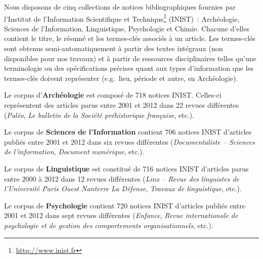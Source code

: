   Nous disposons de cinq collections de notices bibliographiques fournies par
  l'Institut de l’Information Scientifique et
  Technique\footnote{\url{http://www.inist.fr}} (INIST)~: Archéologie, Sciences
  de l'Information, Linguistique, Psychologie et Chimie. Chacune d'elles
  contient le titre, le résumé et les termes-clés associés à un article. Les
  termes-clés sont obtenus semi-automatiquement %
  à partir des textes intégraux (non disponibles pour nos travaux) et à partir
  de ressources disciplinaires telles qu'une terminologie ou des spécifications
  précises quant aux types d'information que les termes-clés doivent représenter
  (e.g.~lieu, période et autre, en Archéologie).

  Le corpus d'\textbf{Archéologie} est composé de 718 notices INIST. Celles-ci
  représentent des articles parus entre 2001 et 2012 dans 22 revues différentes
  (\textit{Paléo}, \textit{Le bulletin de la Société préhistorique française},
  etc.).

  Le corpus de \textbf{Sciences de l'Information} contient 706 notices INIST
  d'articles publiés entre 2001 et 2012 dans six revues différentes
  (\textit{Documentaliste -- Sciences de l'information}, \textit{Document
  numérique}, etc.).

  Le corpus de \textbf{Linguistique} est constitué de 716 notices INIST
  d'articles parus entre 2000 à 2012 dans 12 revues différentes
  (\textit{Linx -- Revue des linguistes de l'Université Paris Ouest Nanterre La
  Défense}, \textit{Travaux de linguistique}, etc.).

  Le corpus de \textbf{Psychologie} contient 720 notices INIST d'articles
  publiés entre 2001 et 2012 dans sept revues différentes
  (\textit{Enfance}, \textit{Revue internationale de psychologie et de gestion
  des comportements organisationnels}, etc.).

